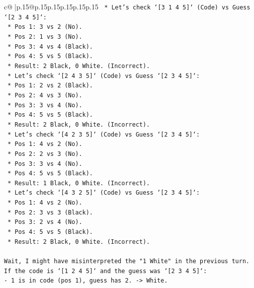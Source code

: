 \documentclass{article}
\begin{document}
{\begin{supertabular}{c@{$\;$}|p{.15\linewidth}@{}p{.15\linewidth}p{.15\linewidth}p{.15\linewidth}p{.15\linewidth}p{.15\linewidth}}
{{{\texttt{    *   Let's check `{[}3 1 4 5{]}` (Code) vs Guess `{[}2 3 4 5{]}`:} \\
\texttt{        *   Pos 1: 3 vs 2 (No).} \\
\texttt{        *   Pos 2: 1 vs 3 (No).} \\
\texttt{        *   Pos 3: 4 vs 4 (Black).} \\
\texttt{        *   Pos 4: 5 vs 5 (Black).} \\
\texttt{        *   Result: 2 Black, 0 White. (Incorrect).} \\
\texttt{    *   Let's check `{[}2 4 3 5{]}` (Code) vs Guess `{[}2 3 4 5{]}`:} \\
\texttt{        *   Pos 1: 2 vs 2 (Black).} \\
\texttt{        *   Pos 2: 4 vs 3 (No).} \\
\texttt{        *   Pos 3: 3 vs 4 (No).} \\
\texttt{        *   Pos 4: 5 vs 5 (Black).} \\
\texttt{        *   Result: 2 Black, 0 White. (Incorrect).} \\
\texttt{    *   Let's check `{[}4 2 3 5{]}` (Code) vs Guess `{[}2 3 4 5{]}`:} \\
\texttt{        *   Pos 1: 4 vs 2 (No).} \\
\texttt{        *   Pos 2: 2 vs 3 (No).} \\
\texttt{        *   Pos 3: 3 vs 4 (No).} \\
\texttt{        *   Pos 4: 5 vs 5 (Black).} \\
\texttt{        *   Result: 1 Black, 0 White. (Incorrect).} \\
\texttt{    *   Let's check `{[}4 3 2 5{]}` (Code) vs Guess `{[}2 3 4 5{]}`:} \\
\texttt{        *   Pos 1: 4 vs 2 (No).} \\
\texttt{        *   Pos 2: 3 vs 3 (Black).} \\
\texttt{        *   Pos 3: 2 vs 4 (No).} \\
\texttt{        *   Pos 4: 5 vs 5 (Black).} \\
\texttt{        *   Result: 2 Black, 0 White. (Incorrect).} \\
\\ 
\texttt{Wait, I might have misinterpreted the "1 White" in the previous turn.} \\
\texttt{If the code is `{[}1 2 4 5{]}` and the guess was `{[}2 3 4 5{]}`:} \\
\texttt{{-} 1 is in code (pos 1), guess has 2. {-}> White.} \\
}}}
\end{supertabular}}
\end{document}
